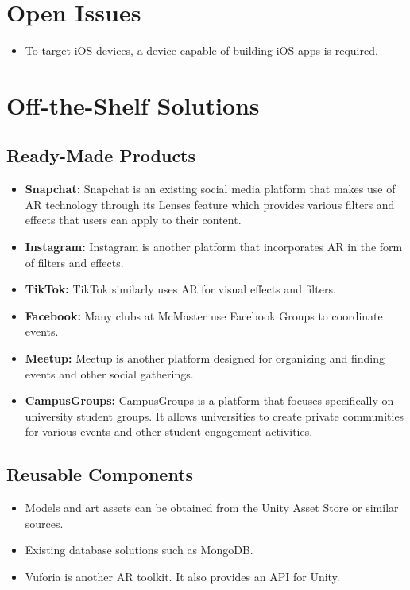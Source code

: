 \documentclass[12pt]{article}
\begin{document}
\section{Open Issues}
\begin{itemize}
  \item To target iOS devices, a device capable of building iOS apps is required.
\end{itemize}

\section{Off-the-Shelf Solutions}
\subsection{Ready-Made Products}
\begin{itemize}
  \item \textbf{Snapchat:} Snapchat is an existing social media platform that makes use of AR technology through its Lenses feature which provides various filters and effects that users can apply to their content.
  \item \textbf{Instagram:} Instagram is another platform that incorporates AR in the form of filters and effects.
  \item \textbf{TikTok:} TikTok similarly uses AR for visual effects and filters.
  \item \textbf{Facebook:} Many clubs at McMaster use Facebook Groups to coordinate events.
  \item \textbf{Meetup:} Meetup is another platform designed for organizing and finding events and other social gatherings.
  \item \textbf{CampusGroups:} CampusGroups is a platform that focuses specifically on university student groups. It allows universities to create private communities for various events and other student engagement activities.
\end{itemize}
\subsection{Reusable Components}
\begin{itemize}
  \item Models and art assets can be obtained from the Unity Asset Store or similar sources.
  \item Existing database solutions such as MongoDB.
  \item Vuforia is another AR toolkit. It also provides an API for Unity.
\end{itemize}
\end{document}
